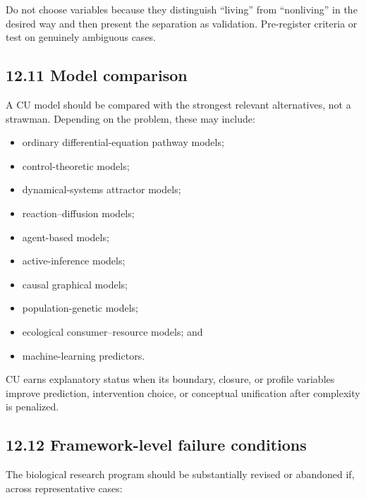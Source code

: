 \documentclass[
  11pt,
]{article}
\providecommand{\tightlist}{%
  \setlength{\itemsep}{0pt}\setlength{\parskip}{0pt}}
\begin{document}
Do not choose variables because they distinguish ``living'' from
``nonliving'' in the desired way and then present the separation as
validation. Pre-register criteria or test on genuinely ambiguous cases.

\subsection{12.11 Model comparison}\label{model-comparison}

A CU model should be compared with the strongest relevant alternatives,
not a strawman. Depending on the problem, these may include:

\begin{itemize}
\tightlist
\item
  ordinary differential-equation pathway models;
\item
  control-theoretic models;
\item
  dynamical-systems attractor models;
\item
  reaction--diffusion models;
\item
  agent-based models;
\item
  active-inference models;
\item
  causal graphical models;
\item
  population-genetic models;
\item
  ecological consumer--resource models; and
\item
  machine-learning predictors.
\end{itemize}

CU earns explanatory status when its boundary, closure, or profile
variables improve prediction, intervention choice, or conceptual
unification after complexity is penalized.

\subsection{12.12 Framework-level failure
conditions}\label{framework-level-failure-conditions}

The biological research program should be substantially revised or
abandoned if, across representative cases:
\end{document}
